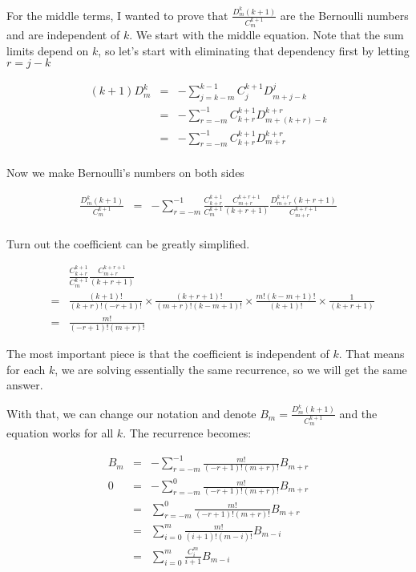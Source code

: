 \documentclass{article}
\begin{document}
For the middle terms, I wanted to prove that $ \frac{D^k_m(k+1)}{C^{k+1}_m} $ are the Bernoulli numbers and are independent of $ k $. We start with the middle equation. Note that the sum limits depend on $ k $, so let's start with eliminating that dependency first by letting $ r = j - k $

\begin{eqnarray*}
  (k+1)D_m^k &=& -\sum\limits_{j=k-m}^{k-1}C_j^{k+1}D_{m+j-k}^j \\
             &=& -\sum\limits_{r=-m}^{-1}C_{k+r}^{k+1}D_{m+(k+r)-k}^{k+r} \\
             &=& -\sum\limits_{r=-m}^{-1}C_{k+r}^{k+1}D_{m+r}^{k+r} \\
\end{eqnarray*}

Now we make Bernoulli's numbers on both sides

\begin{eqnarray*}
  \frac{D^k_m(k+1)}{C^{k+1}_m} &=& -\sum\limits_{r=-m}^{-1}\frac{C_{k+r}^{k+1}}{C^{k+1}_m}\frac{C^{k+r+1}_{m+r}}{(k+r+1)}\frac{D_{m+r}^{k+r}(k+r+1)}{C^{k+r+1}_{m+r}} \\
\end{eqnarray*}

Turn out the coefficient can be greatly simplified.

\begin{eqnarray*}
  & & \frac{C_{k+r}^{k+1}}{C^{k+1}_m}\frac{C^{k+r+1}_{m+r}}{(k+r+1)} \\
  &=& \frac{(k+1)!}{(k+r)!(-r+1)!} \times \frac{(k+r+1)!}{(m+r)!(k-m+1)!} \times \frac{m! (k - m + 1)!}{(k+1)!} \times \frac{1}{(k+r+1)} \\
  &=& \frac{m!}{(-r+1)!(m+r)!}
\end{eqnarray*}

The most important piece is that the coefficient is independent of $ k $. That means for each $ k $, we are solving essentially the same recurrence, so we will get the same answer.

With that, we can change our notation and denote $ B_m = \frac{D^k_m(k+1)}{C^{k+1}_m} $ and the equation works for all $ k $. The recurrence becomes:

\begin{eqnarray*}
  B_m &=& -\sum\limits_{r=-m}^{-1} \frac{m!}{(-r+1)!(m+r)!} B_{m+r} \\
    0 &=& -\sum\limits_{r=-m}^{0} \frac{m!}{(-r+1)!(m+r)!} B_{m+r} \\
      &=& \sum\limits_{r=-m}^{0} \frac{m!}{(-r+1)!(m+r)!} B_{m+r} \\
      &=& \sum\limits_{i=0}^{m} \frac{m!}{(i + 1)!(m-i)!} B_{m-i} \\
      &=& \sum\limits_{i=0}^{m} \frac{C_i^m}{i+1} B_{m-i} \\
\end{eqnarray*}
\end{document}
